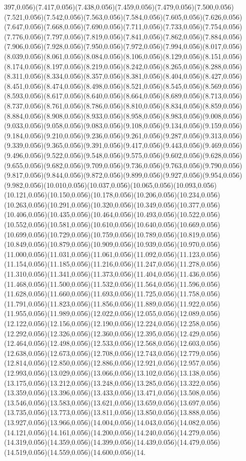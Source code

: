 \documentclass[smallextended]{svjour3}
\begin{document}
397,0.056)(7.417,0.056)(7.438,0.056)(7.459,0.056)(7.479,0.056)(7.500,0.056)(7.521,0.056)(7.542,0.056)(7.563,0.056)(7.584,0.056)(7.605,0.056)(7.626,0.056)(7.647,0.056)(7.668,0.056)(7.690,0.056)(7.711,0.056)(7.733,0.056)(7.754,0.056)(7.776,0.056)(7.797,0.056)(7.819,0.056)(7.841,0.056)(7.862,0.056)(7.884,0.056)(7.906,0.056)(7.928,0.056)(7.950,0.056)(7.972,0.056)(7.994,0.056)(8.017,0.056)(8.039,0.056)(8.061,0.056)(8.084,0.056)(8.106,0.056)(8.129,0.056)(8.151,0.056)(8.174,0.056)(8.197,0.056)(8.219,0.056)(8.242,0.056)(8.265,0.056)(8.288,0.056)(8.311,0.056)(8.334,0.056)(8.357,0.056)(8.381,0.056)(8.404,0.056)(8.427,0.056)(8.451,0.056)(8.474,0.056)(8.498,0.056)(8.521,0.056)(8.545,0.056)(8.569,0.056)(8.593,0.056)(8.617,0.056)(8.640,0.056)(8.664,0.056)(8.689,0.056)(8.713,0.056)(8.737,0.056)(8.761,0.056)(8.786,0.056)(8.810,0.056)(8.834,0.056)(8.859,0.056)(8.884,0.056)(8.908,0.056)(8.933,0.056)(8.958,0.056)(8.983,0.056)(9.008,0.056)(9.033,0.056)(9.058,0.056)(9.083,0.056)(9.108,0.056)(9.134,0.056)(9.159,0.056)(9.184,0.056)(9.210,0.056)(9.236,0.056)(9.261,0.056)(9.287,0.056)(9.313,0.056)(9.339,0.056)(9.365,0.056)(9.391,0.056)(9.417,0.056)(9.443,0.056)(9.469,0.056)(9.496,0.056)(9.522,0.056)(9.548,0.056)(9.575,0.056)(9.602,0.056)(9.628,0.056)(9.655,0.056)(9.682,0.056)(9.709,0.056)(9.736,0.056)(9.763,0.056)(9.790,0.056)(9.817,0.056)(9.844,0.056)(9.872,0.056)(9.899,0.056)(9.927,0.056)(9.954,0.056)(9.982,0.056)(10.010,0.056)(10.037,0.056)(10.065,0.056)(10.093,0.056)(10.121,0.056)(10.150,0.056)(10.178,0.056)(10.206,0.056)(10.234,0.056)(10.263,0.056)(10.291,0.056)(10.320,0.056)(10.349,0.056)(10.377,0.056)(10.406,0.056)(10.435,0.056)(10.464,0.056)(10.493,0.056)(10.522,0.056)(10.552,0.056)(10.581,0.056)(10.610,0.056)(10.640,0.056)(10.669,0.056)(10.699,0.056)(10.729,0.056)(10.759,0.056)(10.789,0.056)(10.819,0.056)(10.849,0.056)(10.879,0.056)(10.909,0.056)(10.939,0.056)(10.970,0.056)(11.000,0.056)(11.031,0.056)(11.061,0.056)(11.092,0.056)(11.123,0.056)(11.154,0.056)(11.185,0.056)(11.216,0.056)(11.247,0.056)(11.278,0.056)(11.310,0.056)(11.341,0.056)(11.373,0.056)(11.404,0.056)(11.436,0.056)(11.468,0.056)(11.500,0.056)(11.532,0.056)(11.564,0.056)(11.596,0.056)(11.628,0.056)(11.660,0.056)(11.693,0.056)(11.725,0.056)(11.758,0.056)(11.791,0.056)(11.823,0.056)(11.856,0.056)(11.889,0.056)(11.922,0.056)(11.955,0.056)(11.989,0.056)(12.022,0.056)(12.055,0.056)(12.089,0.056)(12.122,0.056)(12.156,0.056)(12.190,0.056)(12.224,0.056)(12.258,0.056)(12.292,0.056)(12.326,0.056)(12.360,0.056)(12.395,0.056)(12.429,0.056)(12.464,0.056)(12.498,0.056)(12.533,0.056)(12.568,0.056)(12.603,0.056)(12.638,0.056)(12.673,0.056)(12.708,0.056)(12.743,0.056)(12.779,0.056)(12.814,0.056)(12.850,0.056)(12.886,0.056)(12.921,0.056)(12.957,0.056)(12.993,0.056)(13.029,0.056)(13.066,0.056)(13.102,0.056)(13.138,0.056)(13.175,0.056)(13.212,0.056)(13.248,0.056)(13.285,0.056)(13.322,0.056)(13.359,0.056)(13.396,0.056)(13.433,0.056)(13.471,0.056)(13.508,0.056)(13.546,0.056)(13.583,0.056)(13.621,0.056)(13.659,0.056)(13.697,0.056)(13.735,0.056)(13.773,0.056)(13.811,0.056)(13.850,0.056)(13.888,0.056)(13.927,0.056)(13.966,0.056)(14.004,0.056)(14.043,0.056)(14.082,0.056)(14.121,0.056)(14.161,0.056)(14.200,0.056)(14.240,0.056)(14.279,0.056)(14.319,0.056)(14.359,0.056)(14.399,0.056)(14.439,0.056)(14.479,0.056)(14.519,0.056)(14.559,0.056)(14.600,0.056)(14.
\end{document}
